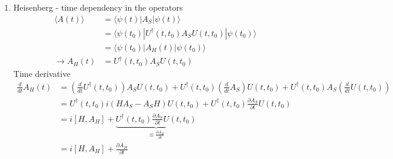 \documentclass[10pt,a4paper]{book}
\theoremstyle{definition}
\begin{document}
\begin{enumerate}
\item Heisenberg - time dependency in the operators
\begin{align}
\langle A(t)\rangle
&=\langle\psi(t)|A_S|\psi(t)\rangle\\
&=\langle\psi(t_0)|U^\dagger(t,t_0)A_SU(t,t_0)|\psi(t_0)\rangle\\
&=\langle\psi(t_0)|A_H(t)|\psi(t_0)\rangle\\
\rightarrow A_H(t)&=U^\dagger(t,t_0)A_SU(t,t_0)
\end{align}
Time derivative
\begin{align}
\frac{d}{dt}A_H(t)
&=\left(\frac{d}{dt}U^\dagger(t,t_0)\right) A_SU(t,t_0)
+U^\dagger(t,t_0) \left(\frac{d}{dt}A_S\right)U(t,t_0)
+U^\dagger(t,t_0) A_S\left(\frac{d}{dt}U(t,t_0)\right)\\
&=U^\dagger(t,t_0)i(HA_S-A_SH)U(t,t_0)+U^\dagger(t,t_0)\frac{\partial A_S}{\partial t}U(t,t_0)\\
&=i[H,A_H]+\underbrace{U^\dagger(t,t_0)\frac{\partial A_S}{\partial t}U(t,t_0)}_{\equiv\frac{\partial A_H}{\partial t}}\\
&=i[H,A_H]+\frac{\partial A_H}{\partial t}
\end{align}


\end{enumerate}
\end{document}
